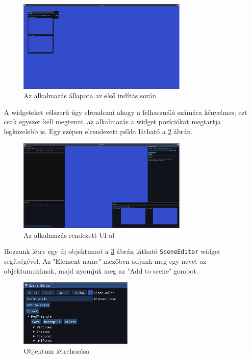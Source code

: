 \begin{figure}[hbt!]
    \centering
    \includegraphics[width=0.75\textwidth,height=\textheight/2,keepaspectratio]
    {resources/Showcase/slimshady_startup.png}
    \caption{Az alkalmazás állapota az első indítás során}
    \label{fig:startup}
\end{figure}

A widgeteket célszerű úgy elrendezni ahogy a felhasználó számára kényelmes, ezt csak egyszer kell megtenni, az alkalmazás a widget pozíciókat megtartja legközelebb is. Egy szépen elrendezett példa látható a \ref{fig:orderedUI} ábrán.

\begin{figure}[hbt!]
    \centering
    \includegraphics[width=0.75\textwidth,height=\textheight/2,keepaspectratio]
    {resources/Showcase/slimshady_orderedUI.png}
    \caption{Az alkalmazás rendezett UI-al}
    \label{fig:orderedUI}
\end{figure}

\newpage

Hozzunk létre egy új objektumot a \ref{fig:newObject}  ábrán látható \verb|SceneEditor| widget segítségével. Az "Element name" mezőben adjunk meg egy nevet az objektumunknak, majd nyomjuk meg az "Add to scene" gombot.

\begin{figure}[hbt!]
    \centering
    \includegraphics[width=0.5\textwidth,height=\textheight/2,keepaspectratio]
    {resources/Showcase/slimshady_newObject.png}
    \caption{Objektum létrehozása}
    \label{fig:newObject}
\end{figure}

